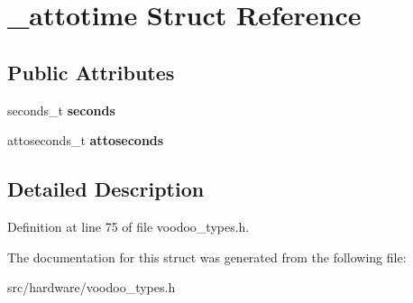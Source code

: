\hypertarget{struct__attotime}{\section{\-\_\-attotime Struct Reference}
\label{struct__attotime}
}
\subsection*{Public Attributes}
\begin{DoxyCompactItemize}
\item 
\hypertarget{struct__attotime_a11b4303253273b8b7dc5fc82147da80c}{seconds\-\_\-t {\bfseries seconds}}\label{struct__attotime_a11b4303253273b8b7dc5fc82147da80c}

\item 
\hypertarget{struct__attotime_af7ee9274078646aaf976eddd087c3beb}{attoseconds\-\_\-t {\bfseries attoseconds}}\label{struct__attotime_af7ee9274078646aaf976eddd087c3beb}

\end{DoxyCompactItemize}


\subsection{Detailed Description}


Definition at line 75 of file voodoo\-\_\-types.\-h.



The documentation for this struct was generated from the following file\-:\begin{DoxyCompactItemize}
\item 
src/hardware/voodoo\-\_\-types.\-h\end{DoxyCompactItemize}
